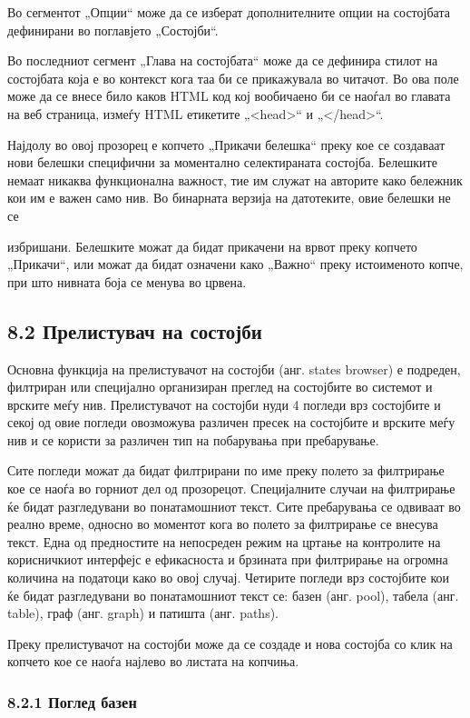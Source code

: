 Во сегментот „Опции“ може да се изберат дополнителните опции на состојбата дефинирани во поглавјето „Состојби“.

Во последниот сегмент „Глава на состојбата“ може да се дефинира стилот на состојбата која е во контекст кога таа би се прикажувала во читачот. Во ова поле може да се внесе било каков HTML код кој вообичаено би се наоѓал во главата на веб страница, измеѓу HTML етикетите „<head>“ и „</head>“.

Најдолу во овој прозорец е копчето „Прикачи белешка“ преку кое се создаваат нови белешки специфични за моментално селектираната состојба. Белешките немаат никаква функционална важност, тие им служат на авторите како бележник кои им е важен само нив. Во бинарната верзија на датотеките, овие белешки не се


избришани. Белешките можат да бидат прикачени на врвот преку копчето „Прикачи“, или можат да бидат означени како „Важно“ преку истоименото копче, при што нивната боја се менува во црвена.

\subsection{8.2 Прелистувач на состојби}

Основна функција на прелистувачот на состојби (анг. states browser) е подреден, филтриран или специјално организиран преглед на состојбите во системот и врските меѓу нив. Прелистувачот на состојби нуди 4 погледи врз состојбите и секој од овие погледи овозможува различен пресек на состојбите и врските меѓу нив и се користи за различен тип на побарувања при пребарување.

Сите погледи можат да бидат филтрирани по име преку полето за филтрирање кое се наоѓа во горниот дел од прозорецот. Специјалните случаи на филтрирање ќе бидат разгледувани во понатамошниот текст. Сите пребарувања се одвиваат во реално време, односно во моментот кога во полето за филтрирање се внесува текст. Една од предностите на непосреден режим на цртање на контролите на корисничкиот интерфејс е ефикасноста и брзината при филтрирање на огромна количина на податоци како во овој случај. Четирите погледи врз состојбите кои ќе бидат разгледувани во понатамошниот текст се: базен (анг. pool), табела (анг. table), граф (анг. graph) и патишта (анг. paths).

Преку прелистувачот на состојби може да се создаде и нова состојба со клик на копчето кое се наоѓа најлево во листата на копчиња.

\subsubsection{8.2.1 Поглед базен}

